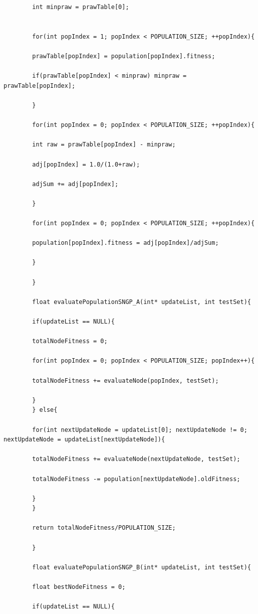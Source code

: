 \documentclass{article}
\begin{document}
\begin{lstlisting}
	    int minpraw = prawTable[0];
	    
	    
	    for(int popIndex = 1; popIndex < POPULATION_SIZE; ++popIndex){
	    
	    prawTable[popIndex] = population[popIndex].fitness;
	    
	    if(prawTable[popIndex] < minpraw) minpraw = prawTable[popIndex];
	    
	    }
	    
	    for(int popIndex = 0; popIndex < POPULATION_SIZE; ++popIndex){
	    
	    int raw = prawTable[popIndex] - minpraw;
	    
	    adj[popIndex] = 1.0/(1.0+raw);
	    
	    adjSum += adj[popIndex];
	    
	    }
	    
	    for(int popIndex = 0; popIndex < POPULATION_SIZE; ++popIndex){
	    
	    population[popIndex].fitness = adj[popIndex]/adjSum;
	    
	    }
	    
	    }
	    
	    float evaluatePopulationSNGP_A(int* updateList, int testSet){
	    
	    if(updateList == NULL){
	    
	    totalNodeFitness = 0;
	    
	    for(int popIndex = 0; popIndex < POPULATION_SIZE; popIndex++){
	    
	    totalNodeFitness += evaluateNode(popIndex, testSet);
	    
	    }
	    } else{
	    
	    for(int nextUpdateNode = updateList[0]; nextUpdateNode != 0; nextUpdateNode = updateList[nextUpdateNode]){
	    
	    totalNodeFitness += evaluateNode(nextUpdateNode, testSet);
	    
	    totalNodeFitness -= population[nextUpdateNode].oldFitness;
	    
	    }
	    }
	    
	    return totalNodeFitness/POPULATION_SIZE;
	    
	    }
	    
	    float evaluatePopulationSNGP_B(int* updateList, int testSet){
	    
	    float bestNodeFitness = 0;
	    
	    if(updateList == NULL){
	    

\end{lstlisting}
\end{document}
